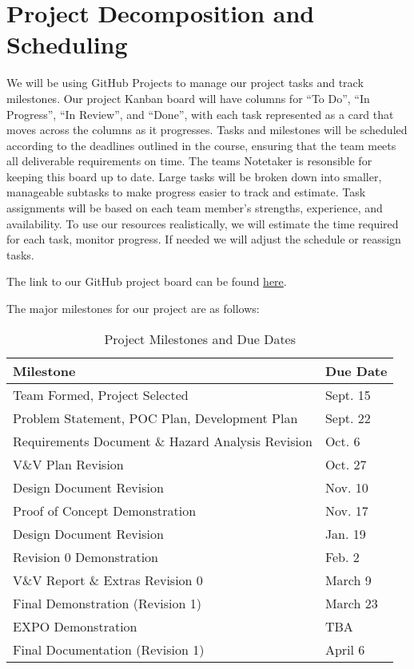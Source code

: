 \documentclass{article}
\begin{document}
\section{Project Decomposition and Scheduling}


\raggedright
We will be using GitHub Projects to manage our project tasks and 
track milestones. Our project Kanban board will have columns for ``To Do'', ``In Progress'', ``In Review'',
and ``Done'', with each task represented as a card that moves across the columns as it progresses. Tasks
and milestones will be scheduled according to the deadlines outlined in the course, ensuring that
the team meets all deliverable requirements on time. The teams Notetaker is resonsible for keeping
this board up to date. Large tasks will be broken down into smaller,
manageable subtasks to make progress easier to track and estimate. Task assignments will be based
on each team member’s strengths, experience, and availability. To use our resources realistically,
we will estimate the time required for each task, monitor progress. If needed we will adjust the
schedule or reassign tasks.

\medskip
The link to our GitHub project board can be found \href{https://github.com/users/SY3141/projects/1}{here}.

\medskip
The major milestones for our project are as follows:
\begin{table}[h!]
  \centering
  \begin{tabular}{|l|l|}
  \hline
  \textbf{Milestone} & \textbf{Due Date} \\ \hline
  Team Formed, Project Selected & Sept. 15 \\ \hline
  Problem Statement, POC Plan, Development Plan & Sept. 22 \\ \hline
  Requirements Document \& Hazard Analysis Revision & Oct. 6 \\ \hline
  V\&V Plan Revision & Oct. 27 \\ \hline
  Design Document Revision & Nov. 10 \\ \hline
  Proof of Concept Demonstration & Nov. 17 \\ \hline
  Design Document Revision & Jan. 19 \\ \hline
  Revision 0 Demonstration & Feb. 2 \\ \hline
  V\&V Report \& Extras Revision 0 & March 9 \\ \hline
  Final Demonstration (Revision 1) & March 23 \\ \hline
  EXPO Demonstration & TBA \\ \hline
  Final Documentation (Revision 1) & April 6 \\ \hline
  
  \end{tabular}
  \caption{Project Milestones and Due Dates}
  \label{tab:project-milestones}
  \end{table}
\end{document}
